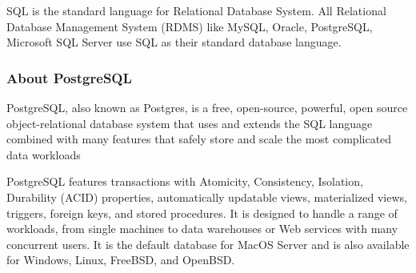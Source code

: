SQL is the standard language for Relational Database System. All Relational
Database Management System (RDMS) like MySQL, Oracle, PostgreSQL, Microsoft SQL
Server use SQL as their standard database language.

\subsubsection{About PostgreSQL}
PostgreSQL, also known as Postgres, is a free, open-source, powerful, open
source object-relational database system that uses and extends the SQL language
combined with many features that safely store and scale the most complicated
data workloads

PostgreSQL features transactions with Atomicity, Consistency, Isolation,
Durability (ACID) properties, automatically updatable views, materialized views,
triggers, foreign keys, and stored procedures. It is designed to handle a range
of workloads, from single machines to data warehouses or Web services with many
concurrent users. It is the default database for MacOS Server and is also
available for Windows, Linux, FreeBSD, and OpenBSD.
